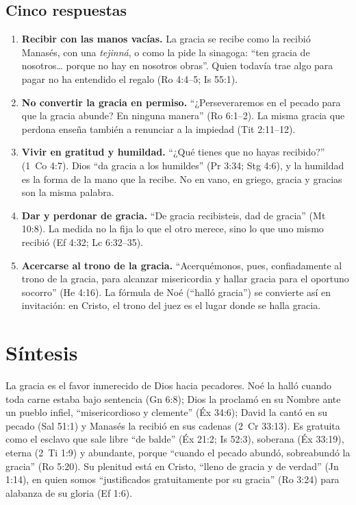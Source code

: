 \documentclass[11pt,letterpaper]{article}
\begin{document}
\subsection{Cinco respuestas}
\begin{enumerate}
\item \textbf{Recibir con las manos vacías.} La gracia se recibe como la recibió Manasés, con una \emph{tejinná}, o como la pide la sinagoga: ``ten gracia de nosotros\ldots{} porque no hay en nosotros obras''. Quien todavía trae algo para pagar no ha entendido el regalo (Ro 4:4--5; Is 55:1).
\item \textbf{No convertir la gracia en permiso.} ``¿Perseveraremos en el pecado para que la gracia abunde? En ninguna manera'' (Ro 6:1--2). La misma gracia que perdona enseña también a renunciar a la impiedad (Tit 2:11--12).
\item \textbf{Vivir en gratitud y humildad.} ``¿Qué tienes que no hayas recibido?'' (1~Co 4:7). Dios ``da gracia a los humildes'' (Pr 3:34; Stg 4:6), y la humildad es la forma de la mano que la recibe. No en vano, en griego, gracia y gracias son la misma palabra.
\item \textbf{Dar y perdonar de gracia.} ``De gracia recibisteis, dad de gracia'' (Mt 10:8). La medida no la fija lo que el otro merece, sino lo que uno mismo recibió (Ef 4:32; Lc 6:32--35).
\item \textbf{Acercarse al trono de la gracia.} ``Acerquémonos, pues, confiadamente al trono de la gracia, para alcanzar misericordia y hallar gracia para el oportuno socorro'' (He 4:16). La fórmula de Noé (``halló gracia'') se convierte así en invitación: en Cristo, el trono del juez es el lugar donde se halla gracia.
\end{enumerate}

\section{Síntesis}

\begin{tcolorbox}[colback=papiro,colframe=azul,boxrule=1pt,arc=3pt,fonttitle=\bfseries,title=La gracia de Dios]
La gracia es el favor inmerecido de Dios hacia pecadores. Noé la halló cuando toda carne estaba bajo sentencia (Gn 6:8); Dios la proclamó en su Nombre ante un pueblo infiel, ``misericordioso y clemente'' (Éx 34:6); David la cantó en su pecado (Sal 51:1) y Manasés la recibió en sus cadenas (2~Cr 33:13). Es gratuita como el esclavo que sale libre ``de balde'' (Éx 21:2; Is 52:3), soberana (Éx 33:19), eterna (2~Ti 1:9) y abundante, porque ``cuando el pecado abundó, sobreabundó la gracia'' (Ro 5:20). Su plenitud está en Cristo, ``lleno de gracia y de verdad'' (Jn 1:14), en quien somos ``justificados gratuitamente por su gracia'' (Ro 3:24) para alabanza de su gloria (Ef 1:6).
\end{tcolorbox}
\end{document}
